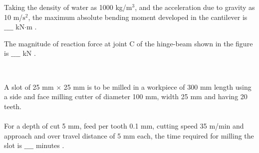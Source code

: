 Taking the density of water as 1000 kg/$\text{m}^3$, and the acceleration due to gravity as 10 m/$\text{s}^2$, the maximum absolute bending moment developed in the cantilever is $\_\_\_\_$ kN$\cdot$m . \\
\item The magnitude of reaction force at joint C of the hinge-beam shown in the figure is $\_\_\_\_$ kN .
\begin{figure}[!ht]
\centering
\resizebox{0.5\textwidth}{!}{%

}%
\end{figure}\\
\item A slot of 25 mm $\times$ 25 mm is to be milled in a workpiece of 300 mm length using a side and face milling cutter of diameter 100 mm, width 25 mm and having 20 teeth.\\\\
For a depth of cut 5 mm, feed per tooth 0.1 mm, cutting speed 35 m/min and approach and over travel distance of 5 mm each, the time required for milling the slot is $\_\_\_\_$ minutes . \\
